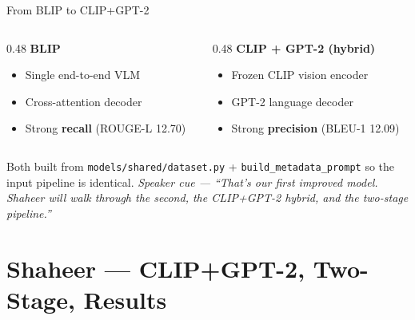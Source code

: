 \documentclass[10pt, aspectratio=169]{beamer}
\newcommand{\speakercue}[1]{%
  \vfill
  {\footnotesize\itshape\color{gray}Speaker cue --- #1}%
}
\begin{document}
\begin{frame}{From BLIP to CLIP+GPT-2}
  \begin{columns}[T]
    \begin{column}{0.48\textwidth}
      \textbf{BLIP}
      \begin{itemize}\itemsep2pt
        \item Single end-to-end VLM
        \item Cross-attention decoder
        \item Strong \textbf{recall} (ROUGE-L 12.70)
      \end{itemize}
    \end{column}
    \begin{column}{0.48\textwidth}
      \textbf{CLIP + GPT-2 (hybrid)}
      \begin{itemize}\itemsep2pt
        \item Frozen CLIP vision encoder
        \item GPT-2 language decoder
        \item Strong \textbf{precision} (BLEU-1 12.09)
      \end{itemize}
    \end{column}
  \end{columns}
  \medskip
  Both built from \texttt{models/shared/dataset.py} + \texttt{build\_metadata\_prompt}
  so the input pipeline is identical.
  \speakercue{``That's our first improved model. Shaheer will walk through the
  second, the CLIP+GPT-2 hybrid, and the two-stage pipeline.''}
\end{frame}

\section*{Shaheer --- CLIP+GPT-2, Two-Stage, Results}
\end{document}
